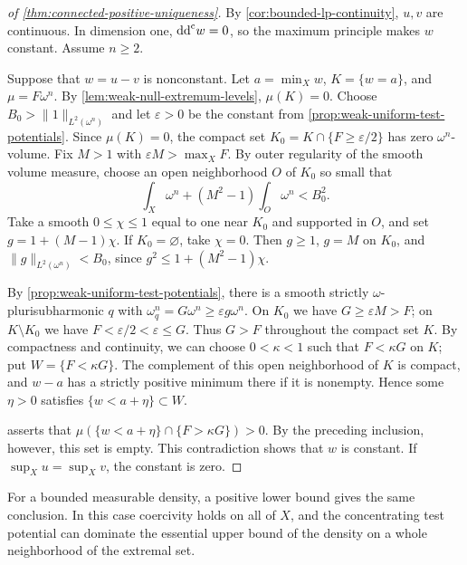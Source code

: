 \begin{proof}[of \cref{thm:connected-positive-uniqueness}]
By \cref{cor:bounded-lp-continuity}, $u,v$ are continuous. In dimension one, $\mathrm{dd}^{\mathrm{c}} w=0$, so the maximum principle makes $w$ constant. Assume $n\geq2$.

Suppose that $w=u-v$ is nonconstant. Let $a=\min_Xw$, $K=\{w=a\}$, and $\mu=F\omega^n$. By \cref{lem:weak-null-extremum-levels}, $\mu(K)=0$. Choose $B_0>\|1\|_{L^2(\omega^n)}$ and let $\varepsilon>0$ be the constant from \cref{prop:weak-uniform-test-potentials}. Since $\mu(K)=0$, the compact set $K_0=K\cap\{F\geq\varepsilon/2\}$ has zero $\omega^n$-volume. Fix $M>1$ with $\varepsilon M>\max_XF$. By outer regularity of the smooth volume measure, choose an open neighborhood $O$ of $K_0$ so small that
\[
\int_X\omega^n+(M^2-1)\int_O\omega^n<B_0^2.
\]
Take a smooth $0\leq\chi\leq1$ equal to one near $K_0$ and supported in $O$, and set $g=1+(M-1)\chi$. If $K_0=\varnothing$, take $\chi=0$. Then $g\geq1$, $g=M$ on $K_0$, and $\|g\|_{L^2(\omega^n)}<B_0$, since $g^2\leq1+(M^2-1)\chi$.

By \cref{prop:weak-uniform-test-potentials}, there is a smooth strictly $\omega$-plurisubharmonic $q$ with $\omega_q^n=G\omega^n\geq\varepsilon g\omega^n$. On $K_0$ we have $G\geq\varepsilon M>F$; on $K\setminus K_0$ we have $F<\varepsilon/2<\varepsilon\leq G$. Thus $G>F$ throughout the compact set $K$. By compactness and continuity, we can choose $0<\kappa<1$ such that $F<\kappa G$ on $K$; put $W=\{F<\kappa G\}$. The complement of this open neighborhood of $K$ is compact, and $w-a$ has a strictly positive minimum there if it is nonempty. Hence some $\eta>0$ satisfies $\{w<a+\eta\}\subset W$.

 asserts that $\mu(\{w<a+\eta\}\cap\{F>\kappa G\})>0$. By the preceding inclusion, however, this set is empty. This contradiction shows that $w$ is constant. If $\sup_Xu=\sup_Xv$, the constant is zero.
\end{proof}

For a bounded measurable density, a positive lower bound gives the same conclusion. In this case coercivity holds on all of $X$, and the concentrating test potential can dominate the essential upper bound of the density on a whole neighborhood of the extremal set.

